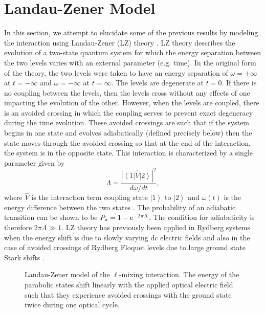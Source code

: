 \section{Landau-Zener Model}
\hspace{\parindent}
In this section, we attempt to elucidate some of the previous
results by modeling the interaction using Landau-Zener (LZ) theory
\cite{Zener:32,Landau:32,Rubbmark:81}.
LZ theory describes the evolution of a two-state quantum system for which the
energy separation between the two levels varies with an external parameter (e.g.
time).  In the original form of the theory, the two levels were taken to have an
energy separation of $\omega = +\infty$ at $t=-\infty$ and $\omega = - \infty$ at
$t=\infty$. The levels are degenerate at $t=0$.  If there is no
coupling between the levels, then the levels cross without any effects of one
impacting the evolution of the other.  However, when the levels are coupled,
there is an avoided crossing in which the coupling serves to prevent exact
degeneracy during the time evolution.  These avoided crossings are such that if
the system begins in one state and evolves adiabatically (defined
precisely below) then the state moves through the avoided crossing so that at the
end of the interaction, the system is in the opposite state.  This interaction
is characterized by a single parameter given by
\begin{equation}
\Lambda =\frac{|\left\langle 1 \right| \hat{V} \left|2\right\rangle|^2}{d \omega/dt},
\end{equation}
where $\hat{V}$ is the interaction term coupling state
$\left|1\right\rangle$ to $\left|2\right\rangle$ and $\omega(t)$ is the energy
difference between the two states \cite{Rubbmark:81}.  The probability of an
adiabatic transition can be shown to be $P_a = 1 - {\rm e}^{-2 \pi
\Lambda}$.  The condition for adiabaticity is therefore $2 \pi \Lambda \gg 1$. 
LZ theory has previously been applied in Rydberg systems when the energy
shift is due to slowly varying dc electric fields \cite{Rubbmark:81} and also
in the case of avoided crossings of Rydberg Floquet levels due to large ground
state Stark shifts \cite{Story:93,Story:94}.

\begin{figure}[tbp]
\bigskip
{} {Landau-Zener model of the
$\ell$-mixing interaction.  The energy of the parabolic states shift linearly
with the applied optical electric field such that they experience avoided
crossings with the ground state twice during one optical cycle.
\label{lz1}}
\end{figure}

